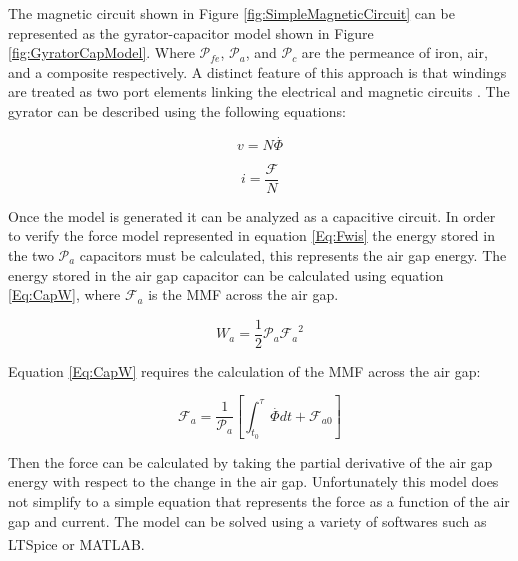 The magnetic circuit shown in Figure \ref{fig:SimpleMagneticCircuit} can be represented as the gyrator-capacitor model shown in Figure \ref{fig:GyratorCapModel}. Where $\mathcal{P}_{fe}$, $\mathcal{P}_{a}$, and $\mathcal{P}_{c}$ are the permeance of iron, air, and a composite respectively. A distinct feature of this approach is that windings are treated as two port elements linking the electrical and magnetic circuits \cite{GyrCapApp}. The gyrator can be described using the following equations:

\begin{equation}\label{Eq:GyrV}
v=N\stackrel{.}{\Phi}
\end{equation}

\begin{equation}\label{Eq:GyrI}
i=\frac{\mathcal{F}}{N}
\end{equation}

Once the model is generated it can be analyzed as a capacitive circuit. In order to verify the force model represented in equation \ref{Eq:Fwis} the energy stored in the two $\mathcal{P}_{a}$ capacitors must be calculated, this represents the air gap energy. The energy stored in the air gap capacitor can be calculated using equation \ref{Eq:CapW}, where $\mathcal{F}_{a}$ is the MMF across the air gap.

\begin{equation}\label{Eq:CapW}
W_{a}=\frac{1}{2}\mathcal{P}_{a}{\mathcal{F}_{a}}^{2}
\end{equation}

Equation \ref{Eq:CapW} requires the calculation of the MMF across the air gap:

\begin{equation}\label{Eq:CapV}
\mathcal{F}_{a}=\frac{1}{\mathcal{P}_{a}}\left[{\int}_{{t}_{0}}^{\tau }\stackrel{.}{\Phi}dt+\mathcal{F}_{a0}\right]
\end{equation}

Then the force can be calculated by taking the partial derivative of the air gap energy with respect to the change in the air gap. Unfortunately this model does not simplify to a simple equation that represents the force as a function of the air gap and current. The model can be solved using a variety of softwares such as LTSpice\textsuperscript{\textregistered} or MATLAB\textsuperscript{\textregistered}. 









